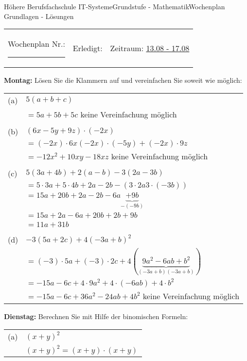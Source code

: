 \documentclass[oneside,openany,headings=optiontotoc,11pt,numbers=noenddot]{scrreprt}
\begin{document}
	\begin{worksheet}{Höhere Berufsfachschule IT-Systeme}{Grundstufe - Mathematik}{Wochenplan Grundlagen - Lösungen}
		\noindent
		\begin{tabularx}{\textwidth}{XXl}
			Wochenplan Nr.: \rule{0.15\textwidth}{1pt} & Erledigt: & Zeitraum: \underline{13.08 - 17.08}
		\end{tabularx}
	
		\begin{framed}
			\noindent
			\textbf{Montag:} Lösen Sie die Klammern auf und vereinfachen Sie soweit wie möglich:\\
			\begin{tabularx}{\textwidth}{lX}
				(a) & \(5(a+b+c)\)\\
				& \(= 5a + 5b + 5c\) keine Vereinfachung möglich\\\\
				(b) & \((6x-5y+9z)\cdot{}(-2x)\)\\
				& \(= (-2x)\cdot{}6x (-2x)\cdot(-5y) + (-2x)\cdot{}9z\)\\
				& \(= -12x^2 +10xy -18xz\) keine Vereinfachung möglich\\\\
				(c) & \(5(3a+4b)+2(a-b)-3(2a-3b)\)\\
				& \(= 5\cdot{}3a + 5\cdot{}4b +2a -2b - (3\cdot{}2a 3\cdot(-3b))\)\\
				& \(= 15a +20b +2a -2b -6a \underbrace{+9b}_{- (-9b)}\)\\
				& \(= 15a + 2a - 6a +20b + 2b + 9b\)\\
				& \(= 11a + 31b\)\\\\
				(d) & \(-3(5a+2c) + 4(-3a+b)^2\)\\
				& \(= (-3)\cdot{}5a + (-3)\cdot{}2c + 4(\underbrace{9a^2-6ab+b^2}_{(-3a+b)(-3a+b)})\)\\
				& \(= -15a -6c + 4\cdot{}9a^2 + 4\cdot{}(-6ab) +4\cdot{}b^2\)\\
				& \(= -15a -6c + 36a^2 - 24ab + 4b^2\) keine Vereinfachung möglich
			\end{tabularx}
		\end{framed}
		\begin{framed}
			\noindent
			\textbf{Dienstag:} Berechnen Sie mit Hilfe der binomischen Formeln:\\
			\begin{tabularx}{\textwidth}{lX}
				(a) & \((x+y)^2\)\\
				& \((x+y)^2 = (x+y)\cdot(x+y)\)\\

\end{tabularx}
\end{framed}
\end{worksheet}
\end{document}
